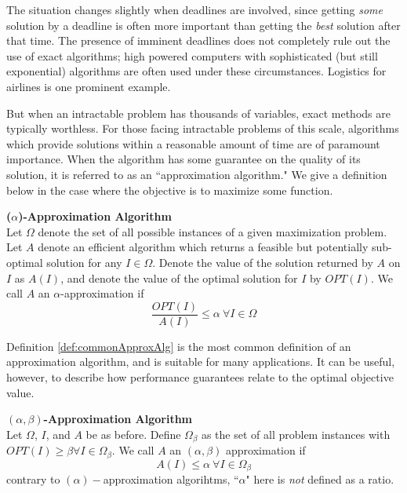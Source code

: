 The situation changes slightly when deadlines are involved, since getting \textit{some} solution by a deadline is often more important than getting the \textit{best} solution after that time. 
The presence of imminent deadlines does not completely rule out the use of exact algorithms; high powered computers with sophisticated (but still exponential) algorithms are often used under these circumstances. 
Logistics for airlines is one prominent example.

But when an intractable problem has thousands of variables, exact methods are typically worthless. 
For those facing intractable problems of this scale, algorithms which provide solutions within a reasonable amount of time are of paramount importance.  
When the algorithm has some guarantee on the quality of its solution, it is referred to as an ``approximation algorithm."
We give a definition below in the case where the objective is to maximize some function. 

\begin{definition}
\textbf{($\alpha$)-Approximation Algorithm} \\
Let $\Omega$ denote the set of all possible instances of a given maximization problem. 
Let $A$ denote an efficient algorithm which returns a feasible but potentially sub-optimal solution for any $I \in \Omega$. 
Denote the value of the solution returned by $A$ on $I$ as $A(I)$, and denote the value of the optimal solution for $I$ by $OPT(I)$. We call $A$ an $\alpha$-approximation if
\begin{equation*}
\frac{OPT(I)}{A(I)} \leq \alpha ~ \forall I \in \Omega
\end{equation*}
\label{def:commonApproxAlg}
\end{definition}

Definition \ref{def:commonApproxAlg} is the most common definition of an approximation algorithm, and is suitable for many applications. It can be useful, however, to describe how performance guarantees relate to the optimal objective value. 
\begin{definition}
\textbf{$(\alpha,\beta)$-Approximation Algorithm } \\
Let $\Omega$, $I$, and $A$ be as before. 
Define $\Omega_\beta$ as the set of all problem instances with $OPT(I) \geq \beta \forall I \in \Omega_\beta$.
We call $A$ an $(\alpha,\beta)$ approximation if 
\begin{equation*}
A(I) \leq \alpha ~ \forall I \in \Omega_{\beta}
\end{equation*}
contrary to $(\alpha)-$approximation algorihtms, ``$\alpha$" here is \textit{not} defined as a ratio.
\label{def:twoParamApproxAlg}
\end{definition}
\newpage